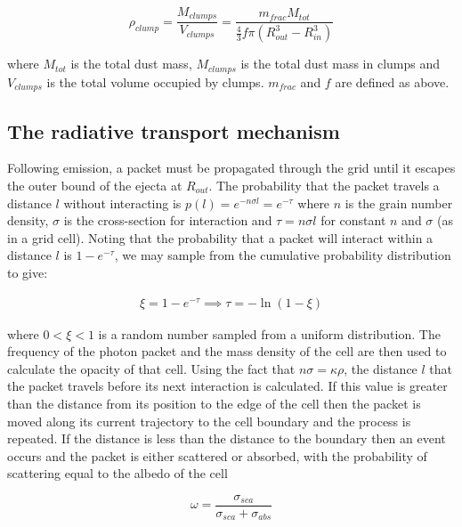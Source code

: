 \documentclass[useAMS,usenatbib,usegraphicx]{mnras}
\begin{document}
\begin{equation}
\rho_{clump}=\frac{M_{clumps}}{V_{clumps}}=\frac{m_{frac}M_{tot}}{\frac{4}{3} f\pi (R_{out}^{3}-R_{in}^{3} )}
\end{equation}

\noindent where $M_{tot}$ is the total dust mass, $M_{clumps}$ is the 
total dust mass in clumps and $V_{clumps}$ is the total volume occupied by 
clumps.  $m_{frac}$ and $f$ are defined as above.


\subsection{The radiative transport mechanism}
\label{transport}

Following emission, a packet must be propagated through the grid until it 
escapes the outer bound of the ejecta at $R_{out}$.  The probability that the 
packet travels a distance $l$ without interacting is $p(l)=e ^{-n \sigma 
l}=e ^{-\tau} $ where $n$ is the grain number density, $\sigma$ is the 
cross-section for interaction and $ \tau = n\sigma l$ for constant $n$ and 
$\sigma$ (as in a grid cell).  Noting that the probability that a packet 
will interact within a distance $l$ is $1-e^{-\tau}$, we may 
sample from the cumulative probability distribution to give:

\begin{align}
\xi = 1 - e^{-\tau} \implies \tau= -\ln (1-\xi)
\end{align}

\noindent where $0<\xi<1$ is a  random number sampled from a uniform distribution.
The frequency of the 
photon packet and the mass density of the cell are then used to calculate 
the opacity of that cell. Using the fact that $n\sigma=\kappa\rho$, 
the distance $l$ that the packet travels before its next interaction is 
calculated.  If this value is greater than the distance from its position 
to the edge of the cell then the packet is moved along its current 
trajectory to the cell boundary and the process is repeated.  If the 
distance is less than the distance to the boundary then an event occurs 
and the packet is either scattered or absorbed, with the probability of 
scattering equal to the albedo of the cell

\begin{equation}
	\omega=\frac{\sigma_{sca}}{\sigma_{sca}+\sigma_{abs}}
\end{equation}
\end{document}
